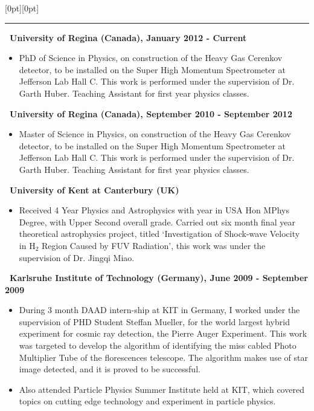 \documentclass[letterpaper,12pt]{letter}
\begin{document}
\secb


\raisebox{0pt}[0pt][0pt]{\Large\textbf{\raisebox{-3.5ex}{History of Study}}} 
\\[2mm]
\rule[-0.5cm]{10cm}{1pt}

\vspace{2mm}

\textbf{\normalsize ~University of Regina (Canada), January 2012 - Current} \\[-8mm]
\begin{itemize}
\item \textrm{\normalsize PhD of Science in Physics, on construction of the Heavy Gas Cerenkov detector, to be installed on the Super High Momentum Spectrometer at Jefferson Lab Hall C.  This work is performed under the supervision of Dr. Garth Huber. Teaching Assistant for first year physics classes.}  
\end{itemize}

\textbf{\normalsize ~University of Regina (Canada), September 2010 - September 2012} \\[-8mm]
\begin{itemize}
\item \textrm{\normalsize Master of Science in Physics, on construction of the Heavy Gas Cerenkov detector, to be installed on the Super High Momentum Spectrometer at Jefferson Lab Hall C.  This work is performed under the supervision of Dr. Garth Huber. Teaching Assistant for first year physics classes.}  
\end{itemize}

\textbf{\normalsize ~University of Kent at Canterbury (UK)} \\[-8mm]
\begin{itemize}
\item \textrm{\normalsize Received 4 Year Physics and Astrophysics with year in USA Hon MPhys Degree, with Upper Second overall grade. Carried out six month final year theoretical astrophysics project, titled \lq Investigation of Shock-wave Velocity in H$_2$ Region Caused by FUV Radiation\rq, this work was under the supervision of Dr. Jingqi Miao.} 
\end{itemize}

\textbf{\normalsize ~Karlsruhe Institute of Technology (Germany), June 2009 - September 2009} \\[-8mm] 

\begin{itemize}
\item \textrm{\normalsize During 3 month DAAD intern-ship at KIT in Germany, I worked under the supervision of PHD Student Steffan Mueller, for the world largest hybrid experiment for cosmic ray detection, the Pierre Auger Experiment. This work was targeted to develop the algorithm of identifying the miss cabled Photo Multiplier Tube of the florescences telescope. The algorithm makes use of star image detected, and it is proved to be successful.}
\item \textrm{\normalsize Also attended Particle Physics Summer Institute held at KIT, which covered topics on cutting edge technology and experiment in particle physics.}
\end{itemize}
\end{document}
